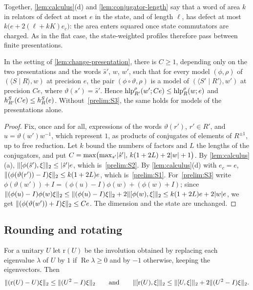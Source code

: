Together, \cref{lem:calculus}(d) and \cref{lem:conjugator-length} say that a word of area $k$ in relators of defect at most $e$ in the
state, and of length $\ell$, has defect at most $k\bigl(e+2(\ell+kK)e_c\bigr)$: the area enters squared once state commutators are
charged. As in the flat case, the state-weighted profiles therefore pass between finite presentations.

\begin{lemma}\label{state:change-presentation}
In the setting of \cref{lem:change-presentation}, there is $C\ge1$, depending only on the two presentations and the words $\hat s'$, $w$,
$w'$, such that for every model $(\phi,\rho)$ of $(\langle S\mid R\rangle,w)$ at precision $e$, the pair $(\phi\circ\vartheta,\rho)$ is a
model of $(\langle S'\mid R'\rangle,w')$ at precision $Ce$, where $\vartheta(s')=\hat s'$. Hence $\operatorname{hlp}^{\rho}_{R'}(w';Ce)\le\operatorname{hlp}^{\rho}_R(w;e)$ and
$h^{S}_{R'}(Ce)\le h^{S}_R(e)$. Without~\ref{prelim:S3}, the same holds for models of the presentations alone.
\end{lemma}

\begin{proof}
Fix, once and for all, expressions of the words $\vartheta(r')$, $r'\in R'$, and $u=\vartheta(w')w^{-1}$, which represent $1$, as products
of conjugates of elements of $R^{\pm1}$, up to free reduction. Let $k$ bound the numbers of factors and $L$ the lengths of the conjugators, and put
$C=\max\bigl(\max_{s'}\lvert \hat s'\rvert,\,k(1+2L)+2\lvert w\rvert+1\bigr)$. By \cref{lem:calculus}(a), $\lVert [\phi(\hat s'),\xi]\rVert_2\le\lvert \hat s'\rvert e$,
which is~\ref{prelim:S2}. By \cref{lem:calculus}(d) with $e_c=e$, $\lVert (\phi(\vartheta(r'))-I)\xi\rVert_2\le k(1+2L)e$, which
is~\ref{prelim:S1}. For~\ref{prelim:S3} write $\phi(\vartheta(w'))+I=(\phi(u)-I)\phi(w)+(\phi(w)+I)$; since
$\lVert (\phi(u)-I)\phi(w)\xi\rVert_2\le\lVert (\phi(u)-I)\xi\rVert_2+2\lVert [\phi(w),\xi]\rVert_2\le k(1+2L)e+2\lvert w\rvert e$, we get
$\lVert (\phi(\vartheta(w'))+I)\xi\rVert_2\le Ce$. The dimension and the state are unchanged.
\end{proof}

\subsection{Rounding and rotating}\label{state:rounding}

\begin{lemma}[Rounding]\label{lem:rounding}
For a unitary $U$ let $\mathrm r(U)$ be the involution obtained by replacing each eigenvalue $\lambda$ of $U$ by $1$ if
$\operatorname{Re}\lambda\ge0$ and by $-1$ otherwise, keeping the eigenvectors. Then
\[
\lVert (\mathrm r(U)-U)\xi\rVert_2\le\lVert (U^2-I)\xi\rVert_2\qquad\text{and}\qquad\lVert [\mathrm r(U),\xi]\rVert_2\le\lVert [U,\xi]\rVert_2+2\lVert (U^2-I)\xi\rVert_2.
\]
\end{lemma}

